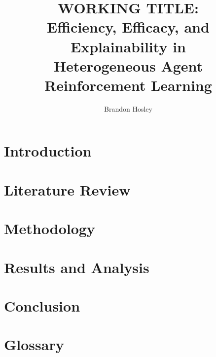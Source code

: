 \documentclass{afitthesis}
\title{ WORKING TITLE:\\
    Efficiency, Efficacy, and Explainability in\\
    Heterogeneous Agent Reinforcement Learning }
\author{Brandon Hosley}
\begin{document}
\maketitle %


\chapter{Introduction}


\chapter{Literature Review}%
\label{ch:literature_review}


\chapter{Methodology}%
\label{ch:methodology}
%
%

\chapter{Results and Analysis}%
\label{ch:results}%
%
\label{ch:discussion}

\chapter{Conclusion}%
\label{ch:conclusion}%
%

%
%


\appendix %

\chapter{Glossary}
\printglossaries%


\nocite{*} %
\clearpage{}%
\printbibliography%
\end{document}
